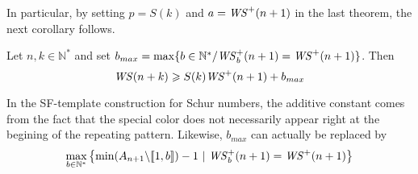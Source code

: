 In particular, by setting \(p = S(k)\) and \(a = \mathit{WS}^+(n + 1)\) in the last theorem, the next corollary follows.

\begin{corollary}
Let \(n,k \in \mathbb{N}^*\) and set \( b_{max} = \max \{b\in \mathbb{N}^*/ \mathit{WS}_b^+(n+1) = \mathit{WS}^+(n+1)\}\).
Then
\[
\mathit{WS}(n+k) \geqslant S(k) \mathit{WS}^+(n+1)+b_{max}
\]
\end{corollary}

\begin{remark}
In the SF-template construction for Schur numbers, the additive constant comes from the fact that the special color does
not necessarily appear right at the begining of the repeating pattern. Likewise, \(b_{max}\) can actually be replaced by
\[
\max_{b \in \mathbb{N}^*} \left\{\min (A_{n+1} \backslash [\![1, b ]\!]) - 1~|~ \mathit{WS}_b^+(n+1) = \mathit{WS}^+(n+1) \right\}
\]
\end{remark}

